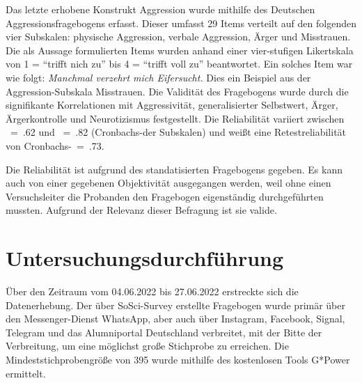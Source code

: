 Das letzte erhobene Konstrukt Aggression wurde mithilfe des Deutschen Aggressionsfragebogens erfasst. Dieser umfasst 29 Items verteilt auf den folgenden vier Subskalen: physische Aggression, verbale Aggression, Ärger und Misstrauen. Die als Aussage formulierten Items wurden anhand einer vier-stufigen Likertskala von 1 = \enquote{trifft nich zu} bis 4 = \enquote{trifft voll zu} beantwortet. Ein solches Item war wie folgt: \textit{Manchmal verzehrt mich Eifersucht.} Dies ein Beispiel aus der Aggression-Subskala Misstrauen. Die Validität des Fragebogens wurde durch die signifikante Korrelationen mit Aggressivität, generalisierter Selbstwert, Ärger, Ärgerkontrolle und Neurotizismus festgestellt. Die Reliabilität variiert zwischen \textalpha~=~.62 und \textalpha~=~.82 (Cronbachs-\textalpha der Subskalen) und weißt eine Retestreliabilität von Cronbachs-\textalpha~=~.73\parencite{Aggressionsfragebogen}.

Die Reliabilität ist aufgrund des standatisierten Fragebogens gegeben. Es kann auch von einer gegebenen Objektivität ausgegangen werden, weil ohne einen Versuchsleiter die Probanden den Fragebogen eigenständig durchgeführten mussten. Aufgrund der Relevanz dieser Befragung ist sie valide.



\section{Untersuchungsdurchführung}   \label{sec_3.4}
Über den Zeitraum vom 04.06.2022 bis 27.06.2022 erstreckte sich die Datenerhebung. Der über SoSci-Survey erstellte Fragebogen wurde primär über den Messenger-Dienst WhatsApp, aber auch über Instagram, Facebook, Signal, Telegram und das Alumniportal Deutschland verbreitet, mit der Bitte der Verbreitung, um eine möglichst große Stichprobe zu erreichen. Die Mindeststichprobengröße von 395 wurde mithilfe des kostenlosen Tools G*Power ermittelt. %


